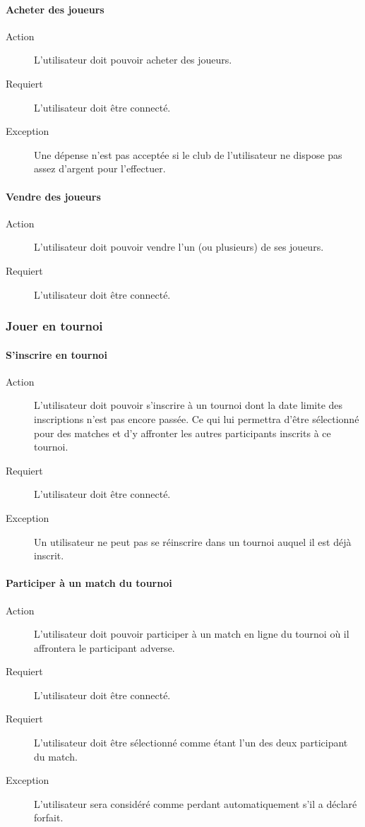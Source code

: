 \documentclass[a4paper]{article}
\begin{document}
\paragraph{Acheter des joueurs}
\begin{description}
\item[Action] L'\gls{utilisateur} doit pouvoir acheter des joueurs.
\item[Requiert] L'\gls{utilisateur} doit être connecté.
\item[Exception] Une dépense n'est pas acceptée si le \gls{club} de l'\gls{utilisateur} ne dispose pas assez d'argent pour l'effectuer.
\end{description}
\paragraph{Vendre des joueurs}
\begin{description}
\item[Action] L'\gls{utilisateur} doit pouvoir vendre l'un (ou plusieurs) de ses joueurs.
\item[Requiert] L'\gls{utilisateur} doit être connecté.
\end{description}

\subsubsection{Jouer en tournoi}
\paragraph{S'inscrire en tournoi}
\begin{description}
\item[Action] L'\gls{utilisateur} doit pouvoir s'inscrire à un tournoi dont la date limite des inscriptions n'est pas encore passée.
Ce qui lui permettra d'être sélectionné pour des matches et d'y affronter les autres participants inscrits à ce tournoi.
\item[Requiert] L'\gls{utilisateur} doit être connecté.
\item[Exception] Un \gls{utilisateur} ne peut pas se réinscrire dans un tournoi auquel il est déjà inscrit.
\end{description} 

\paragraph{Participer à un match du tournoi}
\begin{description}
\item[Action] L'\gls{utilisateur} doit pouvoir participer à un match en ligne du tournoi où il affrontera le participant adverse.
\item[Requiert] L'\gls{utilisateur} doit être connecté.
\item[Requiert] L'\gls{utilisateur} doit être sélectionné comme étant l'un des deux participant du match.
\item[Exception] L'\gls{utilisateur} sera considéré comme perdant automatiquement s'il a déclaré forfait.
\end{description}
\end{document}
